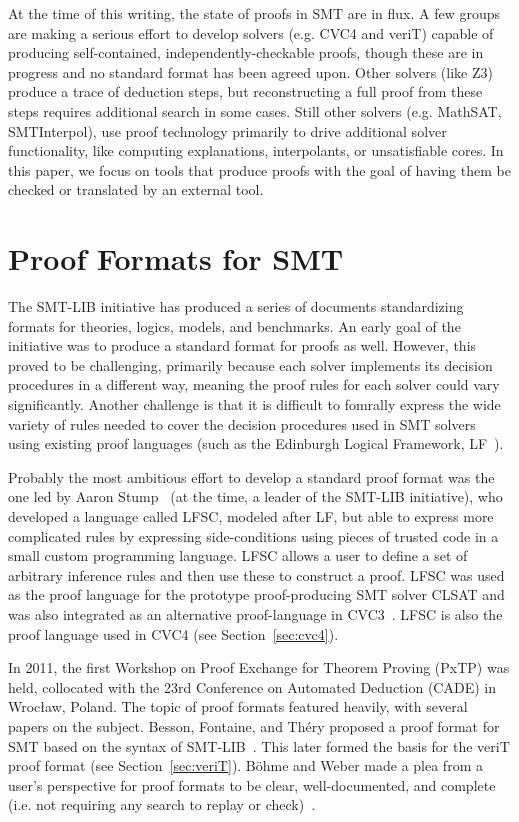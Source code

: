 \documentclass{llncs}
\begin{document}
At the time of this writing, the state of proofs in SMT are in flux.  A few
groups are making a serious effort to develop solvers (e.g. CVC4 and veriT)
capable of producing self-contained, independently-checkable proofs, though
these are in progress and no standard format has been agreed upon.  Other
solvers (like Z3) produce a trace of deduction steps, but reconstructing a full
proof from these steps requires additional search in some cases.  Still other
solvers (e.g. MathSAT, SMTInterpol), use proof technology primarily to drive
additional solver functionality, like computing explanations, interpolants, or
unsatisfiable cores.  In this paper, we focus on tools that produce proofs with
the goal of having them be checked or translated by an external tool.

\section{Proof Formats for SMT}
\label{sec:format}

The SMT-LIB initiative has produced a series of documents standardizing formats
for theories, logics, models, and benchmarks.  An early goal of the initiative
was to produce a standard format for proofs as well.  However, this proved to
be challenging, primarily because each solver implements its decision
procedures in a different way, meaning the proof rules for each solver could
vary significantly.  Another challenge is that it is difficult to fomrally
express the wide variety of rules needed to cover the decision procedures used
in SMT solvers using existing proof languages (such as the Edinburgh Logical
Framework, LF~\cite{HHP93}).

Probably the most ambitious effort to develop a standard proof format was the
one led by Aaron Stump~\cite{ORS09,SO08} (at the time, a leader of the SMT-LIB initiative), who
developed a language called LFSC, modeled after LF, but able to express more
complicated rules by expressing side-conditions using pieces of trusted
code in a small custom programming language.  LFSC allows a user to define a
set of arbitrary inference rules and then use these to construct a proof.  LFSC
was used as the proof language for the prototype proof-producing SMT
solver CLSAT and was also integrated as an alternative proof-language in
CVC3~\cite{SOR+13}.  LFSC is also the proof language used in CVC4 (see Section~\ref{sec:cvc4}).

In 2011, the first Workshop on Proof Exchange for Theorem Proving (PxTP) was
held, collocated with the 23rd Conference on Automated Deduction (CADE) in
Wroc{\l}aw, Poland.  The topic of proof formats featured heavily, with several
papers on the subject.  Besson, Fontaine, and Th\'ery proposed a proof format
for SMT based on the syntax of SMT-LIB~\cite{BFT11}.  This later formed the basis for
the veriT proof format (see Section~\ref{sec:veriT}).  B\"ohme and Weber made a
plea from a user's perspective for proof formats to be clear, well-documented,
and complete (i.e. not requiring any search to replay or check)~\cite{BW11}.
\end{document}
